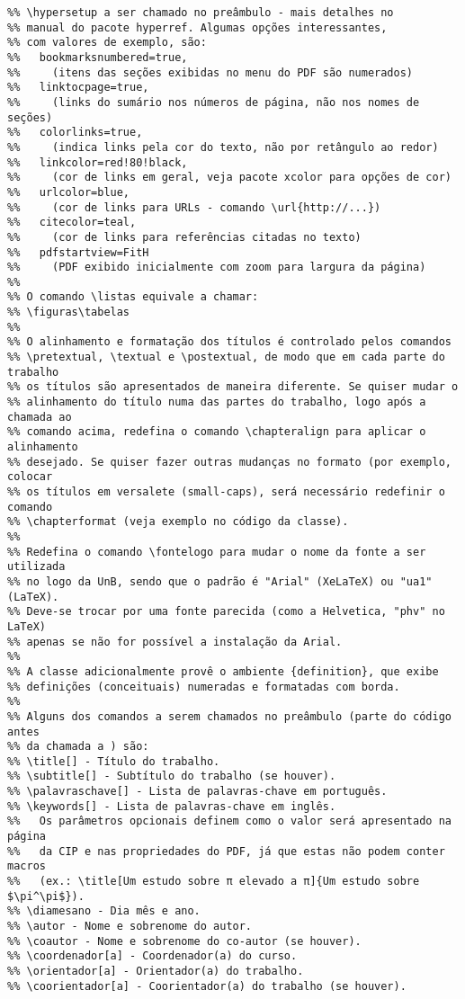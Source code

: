 \begin{verbatim}
%% \hypersetup a ser chamado no preâmbulo - mais detalhes no
%% manual do pacote hyperref. Algumas opções interessantes,
%% com valores de exemplo, são:
%%   bookmarksnumbered=true,
%%	   (itens das seções exibidas no menu do PDF são numerados)
%%   linktocpage=true,
%%	   (links do sumário nos números de página, não nos nomes de seções)
%%   colorlinks=true,
%%	   (indica links pela cor do texto, não por retângulo ao redor)
%%   linkcolor=red!80!black,
%%	   (cor de links em geral, veja pacote xcolor para opções de cor)
%%   urlcolor=blue,
%%	   (cor de links para URLs - comando \url{http://...})
%%   citecolor=teal,
%%	   (cor de links para referências citadas no texto)
%%   pdfstartview=FitH
%%	   (PDF exibido inicialmente com zoom para largura da página)
%%
%% O comando \listas equivale a chamar:
%% \figuras\tabelas
%%
%% O alinhamento e formatação dos títulos é controlado pelos comandos
%% \pretextual, \textual e \postextual, de modo que em cada parte do trabalho
%% os títulos são apresentados de maneira diferente. Se quiser mudar o
%% alinhamento do título numa das partes do trabalho, logo após a chamada ao
%% comando acima, redefina o comando \chapteralign para aplicar o alinhamento
%% desejado. Se quiser fazer outras mudanças no formato (por exemplo, colocar
%% os títulos em versalete (small-caps), será necessário redefinir o comando
%% \chapterformat (veja exemplo no código da classe).
%%
%% Redefina o comando \fontelogo para mudar o nome da fonte a ser utilizada
%% no logo da UnB, sendo que o padrão é "Arial" (XeLaTeX) ou "ua1" (LaTeX).
%% Deve-se trocar por uma fonte parecida (como a Helvetica, "phv" no LaTeX)
%% apenas se não for possível a instalação da Arial.
%%
%% A classe adicionalmente provê o ambiente {definition}, que exibe
%% definições (conceituais) numeradas e formatadas com borda.
%%
%% Alguns dos comandos a serem chamados no preâmbulo (parte do código antes
%% da chamada a ) são:
%% \title[] - Título do trabalho.
%% \subtitle[] - Subtítulo do trabalho (se houver).
%% \palavraschave[] - Lista de palavras-chave em português.
%% \keywords[] - Lista de palavras-chave em inglês.
%%   Os parâmetros opcionais definem como o valor será apresentado na página
%%   da CIP e nas propriedades do PDF, já que estas não podem conter macros
%%   (ex.: \title[Um estudo sobre π elevado a π]{Um estudo sobre $\pi^\pi$}).
%% \diamesano - Dia mês e ano.
%% \autor - Nome e sobrenome do autor.
%% \coautor - Nome e sobrenome do co-autor (se houver).
%% \coordenador[a] - Coordenador(a) do curso.
%% \orientador[a] - Orientador(a) do trabalho.
%% \coorientador[a] - Coorientador(a) do trabalho (se houver).

\end{verbatim}
